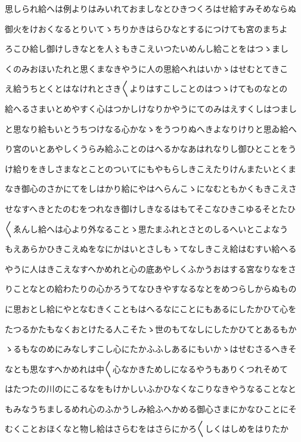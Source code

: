 \documentclass[a4paper,11pt,landscape]{ltjtarticle}
\begin{document}
思しられ給へは例よりはみいれておましなとひきつくろはせ給すみそめならぬ
\par\medskip
御火をけおくなるとりいてゝちりかきはらひなとするにつけても宮のまちよ
\par\medskip
ろこひ給し御けしきなとを人〻もきこえいつたいめんし給ことをはつゝまし
\par\medskip
くのみおほいたれと思くまなきやうに人の思給へれはいかゝはせむとてきこ
\par\medskip
え給うちとくとはなけれとさき〱よりはすこしことのはつゝけてものなとの
\par\medskip
給へるさまいとめやすく心はつかしけなりかやうにてのみはえすくしはつまし
\par\medskip
と思なり給もいとうちつけなる心かなゝをうつりぬへきよなりけりと思ゐ給へ
\par\medskip
り宮のいとあやしくうらみ給ふことのはへるかなあはれなりし御ひとことをう
\par\medskip
け給りをきしさまなとことのついてにもやもらしきこえたりけんまたいとくま
\par\medskip
なき御心のさかにてをしはかり給にやはへらんこゝになむともかくもきこえさ
\par\medskip
せなすへきとたのむをつれなき御けしきなるはもてそこなひきこゆるそとたひ
\par\medskip
〱ゑんし給へは心より外なることゝ思たまふれとさとのしるへいとこよなう
\par\medskip
もえあらかひきこえぬをなにかはいとさしもゝてなしきこえ給はむすい給へる
\par\medskip
やうに人はきこえなすへかめれと心の底あやしくふかうおはする宮なりなをさ
\par\medskip
りことなとの給わたりの心かろうてなひきやすなるなとをめつらしからぬもの
\par\medskip
に思おとし給にやとなむきくこともはへるなにことにもあるにしたかひて心を
\par\medskip
たつるかたもなくおとけたる人こそたゝ世のもてなしにしたかひてとあるもか
\par\medskip
ゝるもなのめにみなしすこし心にたかふふしあるにもいかゝはせむさるへきそ
\par\medskip
なとも思なすへかめれは中〱心なかきためしになるやうもありくつれそめて
\par\medskip
はたつたの川のにこるなをもけかしいふかひなくなこりなきやうなることなと
\par\medskip
もみなうちましるめれ心のふかうしみ給ふへかめる御心さまにかなひことにそ
\par\medskip
むくことおほくなと物し給はさらむをはさらにかろ〱しくはしめをはりたか
\end{document}
